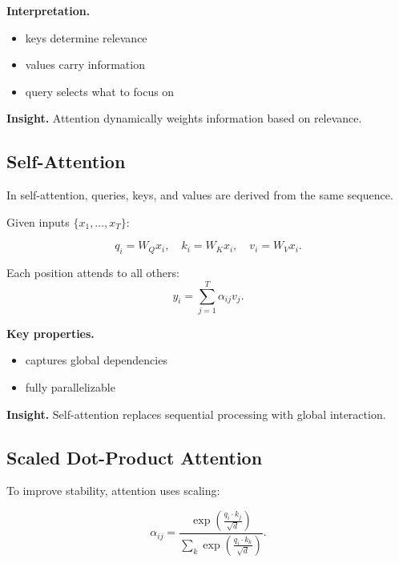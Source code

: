 \medskip

\noindent
\textbf{Interpretation.}

\begin{itemize}
    \item keys determine relevance
    \item values carry information
    \item query selects what to focus on
\end{itemize}

\medskip

\noindent
\textbf{Insight.}  
Attention dynamically weights information based on relevance.

\subsection{Self-Attention}

In self-attention, queries, keys, and values are derived from the same sequence.

\medskip

\noindent
Given inputs $\{x_1, \dots, x_T\}$:

\[
q_i = W_Q x_i, \quad k_i = W_K x_i, \quad v_i = W_V x_i.
\]

\medskip

\noindent
Each position attends to all others:
\[
y_i = \sum_{j=1}^{T} \alpha_{ij} v_j.
\]

\medskip

\noindent
\textbf{Key properties.}

\begin{itemize}
    \item captures global dependencies
    \item fully parallelizable
\end{itemize}

\medskip

\noindent
\textbf{Insight.}  
Self-attention replaces sequential processing with global interaction.

\subsection{Scaled Dot-Product Attention}

To improve stability, attention uses scaling:

\[
\alpha_{ij} =
\frac{\exp\left(\frac{q_i \cdot k_j}{\sqrt{d}}\right)}
{\sum_{k} \exp\left(\frac{q_i \cdot k_k}{\sqrt{d}}\right)}.
\]

\medskip

